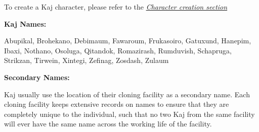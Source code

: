 To create a Kaj character, please refer to the \textit{\hyperref[sec:rules-creation]{Character creation section}}

\textbf{Kaj Names:}

Abupikal, Brohekano, Debimaum, Fawaroum, Frukasoiro, Gatuxund, Hanepim, Ibaxi, Nothano, Osoluga, Qitandok, Romazirash, Rumduvish, Schapruga, Strikzan, Tirwein, Xintegi, Zefinag, Zosdash, Zulaum

\textbf{Secondary Names:}

Kaj usually use the location of their cloning facility as a secondary name. Each cloning facility keeps extensive records on names to ensure that they are completely unique to the individual, such that no two Kaj from the same facility will ever have the same name across the working life of the facility.
